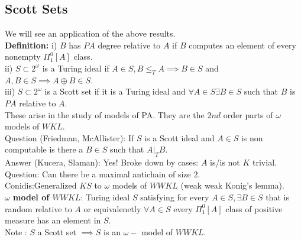 \documentclass{article}
\begin{document}
      \subsection{Scott Sets}
      We will see an application of the above results. \\
      \textbf{Definition:} i) $B$ has $PA$ degree relative to $A$ if $B$ computes an element of every  nonempty $\Pi^0_1[A]$ class.\\
     ii) $S \subset 2^\omega$ is a Turing ideal if $A\in S, B\leq_TA \implies B \in S$ and $A,B \in S \implies A\oplus B \in S$.\\
    iii) $S \subset 2^\omega$ is a Scott set if it is a Turing ideal and $\forall A \in S \exists B \in S$ such that $B$ is $PA$ relative to $A$.
      \\ These arise in the study of models of PA. They are the $2nd $ order parts of $\omega$ models of $WKL$.\\
      Question (Friedman, McAllister): If $S$ is a Scott ideal and $A \in S$ is non computable is there a $B\in S$ such that $A|_T B$.\\
      Answer (Kucera, Slaman): Yes! Broke down by cases: $A$ is/is not $K$ trivial.\\
      Question: Can there be a maximal antichain of size $2$.\\
      Conidis:Generalized $KS$ to $\omega$ models of $WWKL$ (weak weak Konig's lemma).\\
      \textbf{$\omega$ model of $WWKL$}: Turing ideal $S$ satisfying for every $A \in S, \exists B \in S$ that is random relative to $A$ or equivalenetly $\forall A \in S$ every $\Pi^0_1[A]$ class of positive measure has an element in $S$.\\
      Note : $S$ a Scott set $\implies S$ is an $\omega-$ model of $WWKL$.
      \newpage
\end{document}
